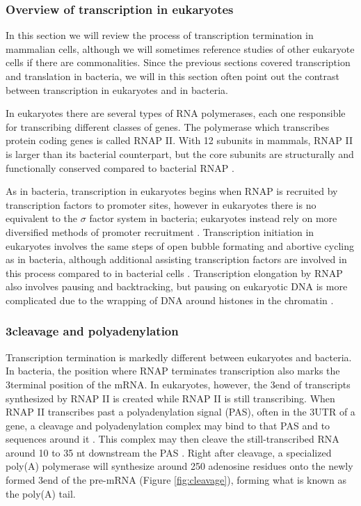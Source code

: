 %
\subsubsection{Overview of transcription in eukaryotes}
In this section we will review the process of transcription termination in
mammalian cells, although we will sometimes reference studies of other
eukaryote cells if there are commonalities. Since the previous sections covered
transcription and translation in bacteria, we will in this section often point
out the contrast between transcription in eukaryotes and in bacteria.

In eukaryotes there are several types of RNA polymerases, each one responsible
for transcribing different classes of genes. The polymerase which transcribes
protein coding genes is called RNAP II. With 12 subunits in mammals, RNAP II is
larger than its bacterial counterpart, but the core subunits are structurally
and functionally conserved compared to bacterial RNAP \cite{ebright_rna_2000}.

As in bacteria, transcription in eukaryotes begins when RNAP is recruited by
transcription factors to promoter sites, however in eukaryotes there is no
equivalent to the $\sigma$ factor system in bacteria; eukaryotes instead rely
on more diversified methods of promoter recruitment
\cite{struhl_fundamentally_1999}. Transcription initiation in eukaryotes
involves the same steps of open bubble formating and abortive cycling as in
bacteria, although additional assisting transcription factors are involved in
this process compared to in bacterial cells \cite{wade_transition_2008}.
Transcription elongation by RNAP also involves pausing and backtracking, but
pausing on eukaryotic DNA is more complicated due to the wrapping of DNA around
histones in the chromatin \cite{sims_elongation_2004}.

\subsubsection{3\protect\ppp cleavage and polyadenylation}
Transcription termination is markedly different between eukaryotes and
bacteria. In bacteria, the position where RNAP terminates transcription also
marks the 3\ppp terminal position of the mRNA. In eukaryotes, however, the
3\ppp end of transcripts synthesized by RNAP II is created while RNAP II is
still transcribing. When RNAP II transcribes past a polyadenylation signal
(PAS), often in the 3\ppp UTR of a gene, a cleavage and polyadenylation complex
may bind to that PAS and to sequences around it \cite{colgan_mechanism_1997}.
This complex may then cleave the still-transcribed RNA around 10 to 35 nt
downstream the PAS \cite{proudfoot_ending_2011}. Right after cleavage, a
specialized poly(A) polymerase will synthesize around 250 adenosine residues
onto the newly formed 3\ppp end of the pre-mRNA (Figure \ref{fig:cleavage}),
forming what is known as the poly(A) tail.

